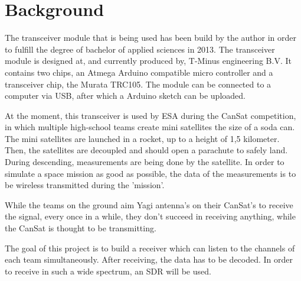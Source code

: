\chapter{Background}

The transceiver module that is being used has been build by the author in order to fulfill the degree of bachelor of applied sciences in 2013. The transceiver module is designed at, and currently produced by, T-Minus engineering B.V. It contains two chips, an Atmega Arduino compatible micro controller and a transceiver chip, the Murata TRC105. The module can be connected to a computer via USB, after which a Arduino sketch can be uploaded.

At the moment, this transceiver is used by ESA during the CanSat competition, in which multiple high-school teams create mini satellites the size of a soda can. The mini satellites are launched in a rocket, up to a height of 1,5 kilometer. Then, the satellites are decoupled and should open a parachute to safely land. During descending, measurements are being done by the satellite. In order to simulate a space mission as good as possible, the data of the measurements is to be wireless transmitted during the 'mission'.

While the teams on the ground aim Yagi antenna's on their CanSat's to receive the signal, every once in a while, they don't succeed in receiving anything, while the CanSat is thought to be transmitting. 

The goal of this project is to build a receiver which can listen to the channels of each team simultaneously. After receiving, the data has to be decoded. In order to receive in such a wide spectrum, an SDR will be used.